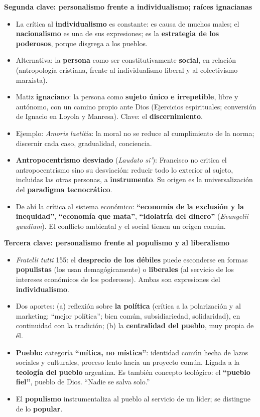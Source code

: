 \documentclass[10pt,a4paper]{article}
\begin{document}
\medskip\noindent \textbf{Segunda clave: personalismo frente a individualismo; raíces ignacianas}\par\nopagebreak
\begin{itemize}
\item La crítica al \textbf{individualismo} es constante: es causa de muchos males; el \textbf{nacionalismo} es una de sus expresiones; es la \textbf{estrategia de los poderosos}, porque disgrega a los pueblos.
\item Alternativa: la \textbf{persona} como ser constitutivamente \textbf{social}, en relación (antropología cristiana, frente al individualismo liberal y al colectivismo marxista).
\item Matiz \textbf{ignaciano}: la persona como \textbf{sujeto único e irrepetible}, libre y autónomo, con un camino propio ante Dios (Ejercicios espirituales; conversión de Ignacio en Loyola y Manresa). Clave: el \textbf{discernimiento}.
\item Ejemplo: \textit{Amoris laetitia}: la moral no se reduce al cumplimiento de la norma; discernir cada caso, gradualidad, conciencia.
\item \textbf{Antropocentrismo desviado} (\textit{Laudato si'}): Francisco no critica el antropocentrismo sino su desviación: reducir todo lo exterior al sujeto, incluidas las otras personas, a \textbf{instrumento}. Su origen es la universalización del \textbf{paradigma tecnocrático}.
\item De ahí la crítica al sistema económico: \textbf{``economía de la exclusión y la inequidad''}, \textbf{``economía que mata''}, \textbf{``idolatría del dinero''} (\textit{Evangelii gaudium}). El conflicto ambiental y el social tienen un origen común.
\end{itemize}

\medskip\noindent \textbf{Tercera clave: personalismo frente al populismo y al liberalismo}\par\nopagebreak
\begin{itemize}
\item \textit{Fratelli tutti} 155: el \textbf{desprecio de los débiles} puede esconderse en formas \textbf{populistas} (los usan demagógicamente) o \textbf{liberales} (al servicio de los intereses económicos de los poderosos). Ambas son expresiones del \textbf{individualismo}.
\item Dos aportes: (a) reflexión sobre \textbf{la política} (crítica a la polarización y al marketing; ``mejor política''; bien común, subsidiariedad, solidaridad), en continuidad con la tradición; (b) la \textbf{centralidad del pueblo}, muy propia de él.
\item \textbf{Pueblo:} categoría \textbf{``mítica, no mística''}: identidad común hecha de lazos sociales y culturales, proceso lento hacia un proyecto común. Ligada a la \textbf{teología del pueblo} argentina. Es también concepto teológico: el \textbf{``pueblo fiel''}, pueblo de Dios. ``Nadie se salva solo.''
\item El \textbf{populismo} instrumentaliza al pueblo al servicio de un líder; se distingue de lo \textbf{popular}.
\end{itemize}
\end{document}
